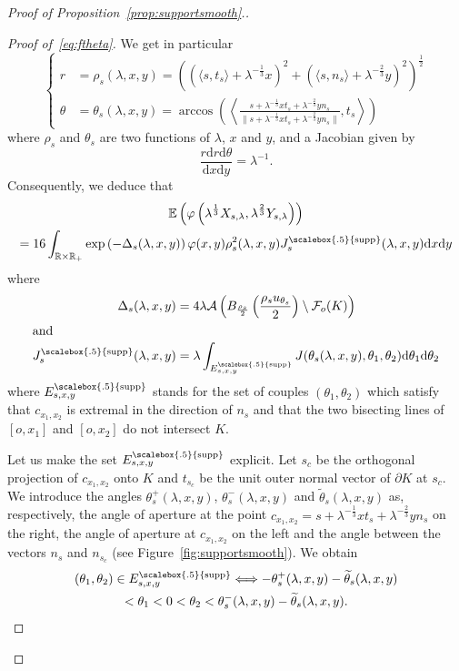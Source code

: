 \documentclass[AHL,Unicode,longabstracts,published]{cedram}
\newcommand{\cA}{\mathcal{A}}
\newcommand{\cF}{\mathcal{F}}
\newcommand{\dd}{\mathrm{d}}
\newcommand{\E}{\mathbb{E}}
\newcommand{\R}{\mathbb{R}}
\DeclareMathOperator{\supp}{\scalebox{.5}{supp}}
\newcommand{\pass}{\vspace{0.3cm}\noindent}
\newcommand{\noi}{\noindent}
\newenvironment*{prooff}{\begin{proof}}{\let\qed\relax\end{proof}}
\newcommand{\R}{\mathbb{R}}
\begin{document}
\begin{proof}[{Proof of Proposition~\ref{prop:supportsmooth}.}]
\begin{prooff}[{Proof of~\eqref{eq:ftheta}}]
We get in particular
\begin{equation}\label{eq:defrho}
\begin{cases}
r &=  \rho_s(\lambda,x,y)=\left(\left(\langle s,t_s\rangle+\lambda^{-\frac{1}{3}}x\right)^2+\left(\langle s,n_s\rangle+\lambda^{-\frac{2}{3}}y\right)^2\right)^\frac12 \\
\theta &=  \theta_s(\lambda,x,y) = \arccos\left(\left\langle \frac{s+\lambda^{-\frac1{3}}xt_s+\lambda^{-\frac{2}{3}}yn_s}{\bigl\|s+\lambda^{-\frac{1}{3}}xt_s+\lambda^{-\frac{2}{3}}yn_s\bigr\|},t_{s}\right\rangle\right)
\end{cases}
\end{equation}
where $\rho_s$ and $\theta_s$ are two functions of $\lambda$, $x$ and $y$, and a Jacobian given by
\[
\frac{r\dd r\dd \theta}{\dd x \dd y} = \lambda^{-1}.
\]
Consequently, we deduce that
\begin{multline}\label{eq:formuleexacte}
\E\left(\varphi\left(\lambda^{\frac1{3}}X_{s,\lambda},\lambda^{\frac{2}{3}}Y_{s,\lambda}\right)\right)\\
= 16\int_{\R\times \R_+}\exp\left(-\Delta_s(\lambda,x,y)\right)\varphi(x,y)\rho_s^2(\lambda,x,y)J^{\supp}_s(\lambda,x,y)\dd x \dd y
\end{multline}
where
\begin{align*}
\Delta_s(\lambda,x,y)&=4\lambda\cA\left(B_{\frac{\rho_s}{2}}\left(\frac{\rho_s u_{\theta_s}}{2}\right)\setminus \cF_o(K)\right)
\\
\intertext{and}
J^{\supp}_s(\lambda,x,y)&=\lambda\int_{E^{\supp}_{s,x,y}} J(\theta_s(\lambda,x,y),\theta_1,\theta_2)\dd \theta_1\dd \theta_2
\end{align*}
where $E^{\supp}_{s,x,y}$ stands for the set of couples $(\theta_1,\theta_2)$ which satisfy that $c_{x_1,x_2}$ is extremal in the direction of $n_s$ and that the two bisecting lines of $[o,x_1]$ and $[o,x_2]$ do not intersect $K$.

Let us make the set $E^{\supp}_{s,x,y}$ explicit. Let $s_c$ be the orthogonal projection of $c_{x_1,x_2}$ onto $K$ and $t_{s_c}$ be the unit outer normal vector of $\partial K$ at $s_c$. We introduce the angles $\theta_s^+(\lambda,x,y)$, $\theta_s^-(\lambda,x,y)$ and $\widetilde{\theta}_s(\lambda,x,y)$ as, respectively, the angle of aperture at the point $c_{x_1,x_2}=s+\lambda^{-\frac1{3}}x t_s+\lambda^{-\frac{2}{3}}y n_s$ on the right, the angle of aperture at $c_{x_1,x_2}$ on the left and the angle between the vectors $n_s$ and $n_{s_c}$ (see Figure~\ref{fig:supportsmooth}). We obtain
\begin{multline}\label{eq:condanglessmooth}
(\theta_1,\theta_2)\in E^{\supp}_{s,x,y}\Longleftrightarrow -\theta_s^+(\lambda,x,y)-\widetilde{\theta}_s(\lambda,x,y)\\
< \theta_1<0<\theta_2<\theta_s^-(\lambda,x,y)-\widetilde{\theta}_s(\lambda,x,y).
\end{multline}


\end{prooff}
\end{proof}
\end{document}
